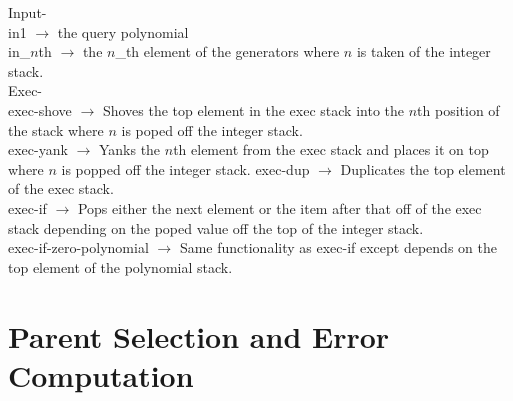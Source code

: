 \documentclass[12pt]{article}
\begin{document}
\noindent Input- \\
\indent in1 $\rightarrow$ the query polynomial \\
\indent in\_$n$th $\rightarrow$ the $n$\_th element of the generators where $n$ is taken of the integer stack. \\

\noindent Exec- \\
\indent exec-shove $\rightarrow$ Shoves the top element in the exec stack into the $n$th position of the stack where $n$ is poped off the integer stack. \\
\indent exec-yank $\rightarrow$ Yanks the $n$th element from the exec stack and places it on top where $n$ is popped off the integer stack.
\indent exec-dup $\rightarrow$ Duplicates the top element of the exec stack. \\
\indent exec-if $\rightarrow$ Pops either the next element or the item after that off of the exec stack depending on the poped value off the top of the integer stack. \\
\indent exec-if-zero-polynomial $\rightarrow$ Same functionality as exec-if except depends on the top element of the polynomial stack.


\newpage
\section*{Parent Selection and Error Computation}
\end{document}

